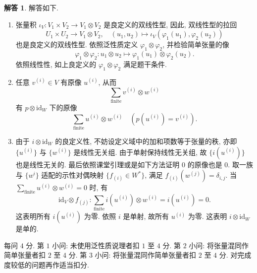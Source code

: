 \documentclass{MainStyle}
\theoremstyle{definition}
\newtheorem{solution}{解答}
\begin{document}
\begin{solution}
    解答如下.
    \begin{enumerate}
        \item 张量积 $\iota_V:V_1\times V_2\to V_1\otimes V_2$ 是良定义的双线性型, 因此, 双线性型的拉回
              \begin{equation*}
                  U_1\times U_2\to V_1\otimes V_2,\quad (u_1,u_2)\mapsto \iota_V(\varphi_1(u_1),\varphi_2(u_2))
              \end{equation*}
              也是良定义的双线性型. 依照泛性质定义 $\varphi_1\otimes \varphi_2$, 并检验简单张量的像
              \begin{equation*}
                  \varphi_1\otimes \varphi_2:u_1\otimes u_2\mapsto \varphi_1(u_1)\otimes \varphi_2(u_2).
              \end{equation*}
              依照线性性, 如上良定义的 $\varphi_1\otimes \varphi_2$ 满足题干条件.
        \item 任意 $v^{(i)}\in V$ 有原像 $u^{(i)}$, 从而
              \begin{equation*}
                  \sum_{\text{finite}}v^{(i)}\otimes w^{(i)}
              \end{equation*}
              有 $p\otimes \mathrm{id}_W$ 下的原像
              \begin{equation*}
                  \sum_{\text{finite}}u^{(i)}\otimes w^{(i)}\quad (p(u^{(i)})=v^{(i)}).
              \end{equation*}
        \item 由于 $i\otimes \mathrm{id}_W$ 的良定义性, 不妨设定义域中的加和项数等于张量的秩, 亦即 $\{u^{(i)}\}$ 与 $\{w^{(i)}\}$ 是线性无关组. 由于单射保持线性无关组, 故 $\{i(u^{(i)})\}$ 也是线性无关的. 最后依照课堂引理或是如下方法证明 $0$ 的原像也是 $0$. 取一族与 $\{w^{i}\}$ 适配的示性对偶映射 $\{f_{(i)}\in W^\ast\}$, 满足 $f_{(i)}(w^{(j)})=\delta_{i,j}$. 当 $\sum_{\text{finite}}u^{(i)}\otimes w^{(i)}=0$ 时, 有
              \begin{equation*}
                  \mathrm{id}_V\otimes f_{(j)}: \sum_{\text{finite}}i(u^{(i)})\otimes w^{(i)}=i(u^{(i)})=0.
              \end{equation*}
              这表明所有 $i(u^{(i)})$ 为零. 依照 $i$ 是单射, 故所有 $u^{(i)}$ 为零. 这表明 $i\otimes \mathrm{id}_W$ 是单的.
    \end{enumerate}
\end{solution}

\begin{evaluation}
    每问 $4$ 分. 第 $1$ 小问: 未使用泛性质说理者扣 $1$ 至 $4$ 分. 第 $2$ 小问: 将张量混同作简单张量者扣 $2$ 至 $4$ 分. 第 $3$ 小问: 将张量混同作简单张量者扣 $2$ 至 $4$ 分. 对完成度较低的问题再作适当扣分.
\end{evaluation}
\end{document}
